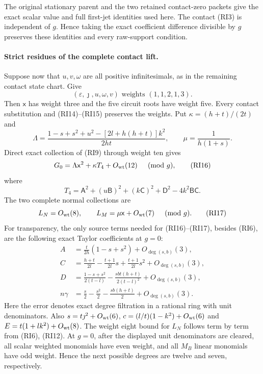 The original stationary parent and the two retained contact-zero
packets give the exact scalar value and full first-jet identities
used here. The contact (RI3) is independent of $g$. Hence taking
the exact coefficient difference divisible by $g$ preserves these
identities and every raw-support condition.

\paragraph{Strict residues of the complete contact lift.}
Suppose now that $u,v,\omega$ are all positive infinitesimals, as
in the remaining contact state chart. Give
\[
 (\varepsilon,\jmath,u,\omega,v)
       \text{ weights }(1,1,2,1,3).
\]
Then $\mathsf x$ has weight three and the five circuit roots have
weight five. Every contact substitution and (RI14)--(RI15) preserves
the weights. Put $\kappa=(h+t)/(2t)$ and
\[
 \Lambda=\frac{1-s+s^2+u^2-[2l+h(h+t)]k^2}{2ht},\qquad
 \mu=\frac1{h(1+s)}.
\]
Direct exact collection of (RI9) through weight ten gives
\[
 G_0=\Lambda\mathsf x^2+\kappa T_4+O_{\rm wt}(12)
                   \quad\pmod g,                 \tag{RI16}
\]
where
\[
 T_4=\mathsf A^2+(u\mathsf B)^2+(k\mathsf C)^2+
          \mathsf D^2-4k^2\mathsf B\mathsf C.
\]
The two complete normal collections are
\[
 L_N=O_{\rm wt}(8),\qquad
 L_M=\mu\mathsf x+O_{\rm wt}(7)\quad\pmod g.
 \tag{RI17}
\]
For transparency, the only source terms needed for (RI16)--(RI17),
besides (RI6), are the following exact Taylor coefficients at $g=0$:
\[
\begin{aligned}
 A&=\frac t{2h}(1-s+s^2)+O_{\deg(s,b)}(3),\\
 C&=\frac{h+t}{2l}-\frac{t+1}{2l}s+
                      \frac{t+1}{2l}s^2+O_{\deg(s,b)}(3),\\
 D&=\frac{1-s+s^2}{2(t-l)}-
        \frac{sbt(h+t)}{2(t-l)^2}+O_{\deg(s,b)}(3),\\
 n\gamma&=\frac s2-\frac{s^2}2-\frac{sb(h+t)}2+
                         O_{\deg(s,b)}(3).
\end{aligned}                                                       \tag{RI18}
\]
Here the error denotes exact degree filtration in a rational ring
with unit denominators. Also $s=t\jmath^2+O_{\rm wt}(6)$,
$c=(l/t)(1-k^2)+O_{\rm wt}(6)$ and
$E=t(1+lk^2)+O_{\rm wt}(8)$. The weight eight bound for $L_N$
follows term by term from (RI6), (RI12).
At $g=0$, after the displayed unit denominators are cleared, all
scalar weighted monomials have even weight, and all $M_B$ linear
monomials have odd weight. Hence the next possible degrees are
twelve and seven, respectively.

